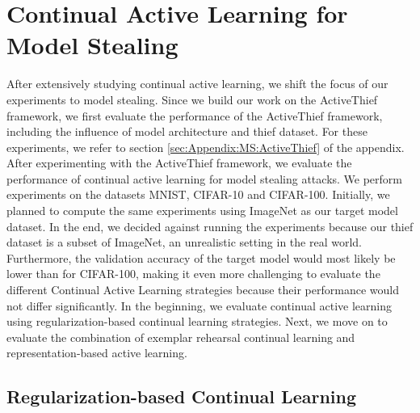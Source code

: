 \section{Continual Active Learning for Model Stealing}
\label{sec:Evaluation:MS}
After extensively studying continual active learning, we shift the focus of our experiments to model stealing. Since we build our work on the ActiveThief framework,
we first evaluate the performance of the ActiveThief framework, including the influence of model architecture and thief dataset. For these experiments, we refer to
section \ref{sec:Appendix:MS:ActiveThief} of the appendix. After experimenting with the ActiveThief framework, we evaluate the performance of continual active learning
for model stealing attacks. We perform experiments on the datasets MNIST, CIFAR-10 and CIFAR-100. Initially, we planned to compute the same experiments using ImageNet
as our target model dataset. In the end, we decided against running the experiments because our thief dataset is a subset of ImageNet, an unrealistic setting in 
the real world. Furthermore, the validation accuracy of the target model would most likely be lower than for CIFAR-100, making it even more challenging to
evaluate the different Continual Active Learning strategies because their performance would not differ significantly. In the beginning, we evaluate continual active
learning using regularization-based continual learning strategies. Next, we move on to evaluate the combination of exemplar rehearsal continual learning and
representation-based active learning. \par


\subsection{Regularization-based Continual Learning}
\label{sec:Evaluation:MS:Regularization}

